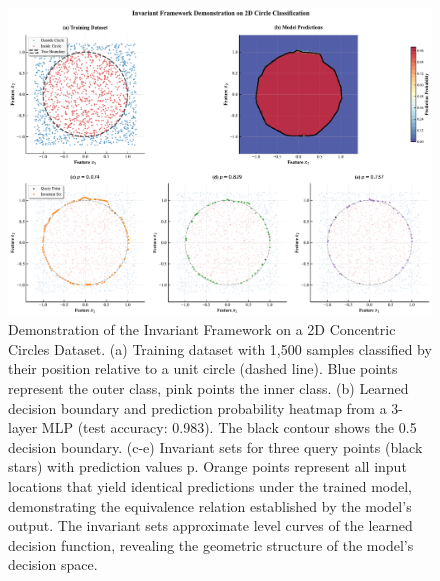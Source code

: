 \begin{figure}[h]
\centering
\includegraphics[width=\linewidth]{figures/main/invariant_framework_combined.pdf}
\caption{Demonstration of the Invariant Framework on a 2D Concentric Circles Dataset.
(a) Training dataset with 1,500 samples classified by their position relative to a unit circle (dashed line). Blue points represent the outer class, pink points the inner class.
(b) Learned decision boundary and prediction probability heatmap from a 3-layer MLP (test accuracy: 0.983). The black contour shows the 0.5 decision boundary.
(c-e) Invariant sets for three query points (black stars) with prediction values p. Orange points represent all input locations that yield identical predictions under the trained model, demonstrating the equivalence relation established by the model's output. The invariant sets approximate level curves of the learned decision function, revealing the geometric structure of the model's decision space.}
\label{fig:teaser}
\end{figure}

